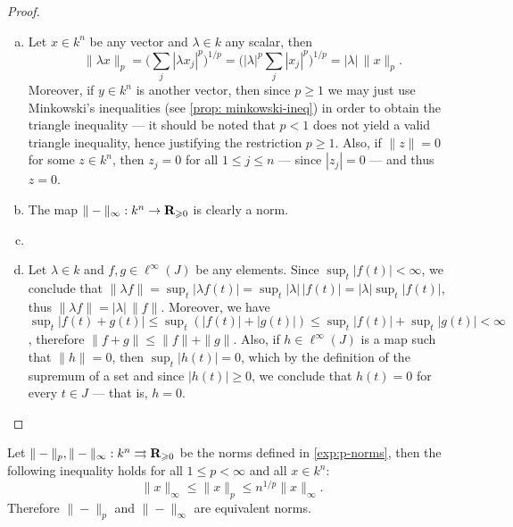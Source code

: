 \begin{proof}
\begin{enumerate}[(a)]\setlength\itemsep{0em}
\item Let \(x \in k^n\) be any vector and \(\lambda \in k\) any scalar, then
\[
\| \lambda x \|_p
= \bigg( \sum_j | \lambda x_j |^p \bigg)^{1/p}
= \bigg( |\lambda|^p \sum_j | x_j |^p \bigg)^{1/p}
= |\lambda|\, \| x \|_p.
\]
Moreover, if \(y \in k^n\) is another vector, then since \(p \geq 1\) we may
just use Minkowski's inequalities (see \cref{prop: minkowski-ineq}) in order to
obtain the triangle inequality --- it should be noted that \(p < 1\) does not
yield a valid triangle inequality, hence justifying the restriction \(p \geq
1\). Also, if \(\| z \| = 0\) for some \(z \in k^n\), then \(z_j = 0\) for all
\(1 \leq j \leq n\) --- since \(|z_j| = 0\) --- and thus \(z = 0\).

\item The map \(\| - \|_{\infty}: k^n \to \mathbf{R}_{\geqslant 0}\) is clearly a norm.

\item

\item Let \(\lambda \in k\) and \(f, g \in \ell^{\infty}(J)\) be any
elements. Since \(\sup_t |f(t)| < \infty\), we conclude that \(\| \lambda f \| =
\sup_t |\lambda f(t)| = \sup_t |\lambda|\, |f(t)| = |\lambda| \sup_t |f(t)|\),
thus \(\| \lambda f \| = |\lambda|\, \| f \|\). Moreover, we have \(\sup_t |f(t)
+ g(t)| \leq \sup_t (|f(t)| + |g(t)|) \leq \sup_t |f(t)| + \sup_t |g(t)| <
\infty\), therefore \(\| f + g \| \leq \| f \| + \| g \|\). Also, if \(h \in
\ell^{\infty}(J)\) is a map such that \(\| h \| = 0\), then \(\sup_t |h(t)| =
0\), which by the definition of the supremum of a set and since \(|h(t)| \geq
0\), we conclude that \(h(t) = 0\) for every \(t \in J\) --- that is, \(h = 0\).
\end{enumerate}
\end{proof}

\begin{lemma}
\label{lem:p-norms-equivalent-finite-case}
Let \(\| - \|_p, \| - \|_{\infty}: k^n \rightrightarrows \mathbf{R}_{\geqslant 0}\) be the
norms defined in \cref{exp:p-norms}, then the following inequality holds for all
\(1 \leq p < \infty\) and all \(x \in k^n\):
\[
\| x \|_{\infty} \leq \| x \|_p \leq n^{1/p} \| x \|_{\infty}.
\]
Therefore \(\| - \|_p\) and \(\| - \|_{\infty}\) are equivalent norms.
\end{lemma}

